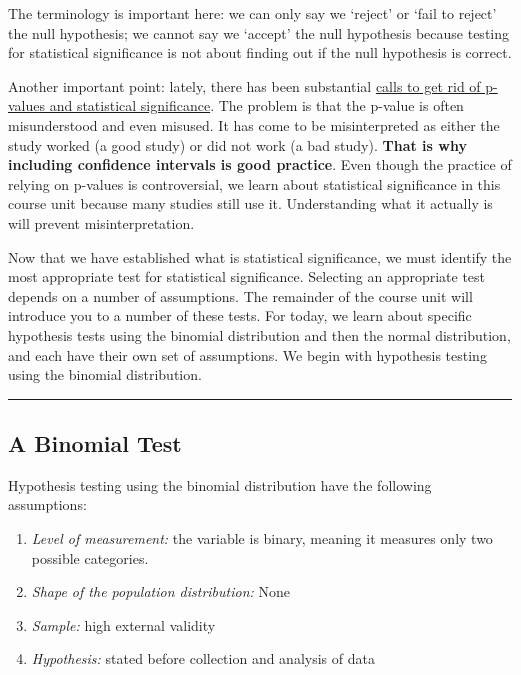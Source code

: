 \documentclass[
]{book}
\begin{document}
The terminology is important here: we can only say we `reject' or `fail to reject' the null hypothesis; we cannot say we `accept' the null hypothesis because testing for statistical significance is not about finding out if the null hypothesis is correct.

Another important point: lately, there has been substantial \href{https://www.vox.com/latest-news/2019/3/22/18275913/statistical-significance-p-values-explained}{calls to get rid of p-values and statistical significance}. The problem is that the p-value is often misunderstood and even misused. It has come to be misinterpreted as either the study worked (a good study) or did not work (a bad study). \textbf{That is why including confidence intervals is good practice}. Even though the practice of relying on p-values is controversial, we learn about statistical significance in this course unit because many studies still use it. Understanding what it actually is will prevent misinterpretation.

Now that we have established what is statistical significance, we must identify the most appropriate test for statistical significance. Selecting an appropriate test depends on a number of assumptions. The remainder of the course unit will introduce you to a number of these tests. For today, we learn about specific hypothesis tests using the binomial distribution and then the normal distribution, and each have their own set of assumptions. We begin with hypothesis testing using the binomial distribution.

\begin{center}\rule{0.5\linewidth}{0.5pt}\end{center}

\hypertarget{a-binomial-test}{%
\subsection{A Binomial Test}\label{a-binomial-test}}

Hypothesis testing using the binomial distribution have the following assumptions:

\begin{enumerate}
\def\labelenumi{\arabic{enumi}.}
\item
  \emph{Level of measurement:} the variable is binary, meaning it measures only two possible categories.
\item
  \emph{Shape of the population distribution:} None
\item
  \emph{Sample:} high external validity
\item
  \emph{Hypothesis:} stated before collection and analysis of data
\end{enumerate}
\end{document}
